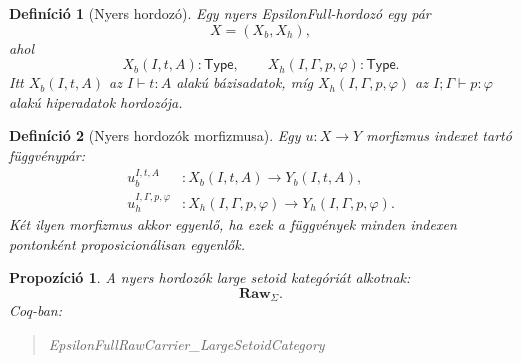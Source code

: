 \documentclass[11pt]{article}
\newtheorem{definition}{Definíció}
\newtheorem{proposition}{Propozíció}
\newenvironment{coqblock}
  {\begin{quote}\small\ttfamily\obeylines}
  {\end{quote}}
\newcommand{\Raw}{\mathbf{Raw}_{\Sigma}}
\begin{document}
\begin{definition}[Nyers hordozó]
Egy nyers EpsilonFull-hordozó egy pár
\[
  X=(X_b,X_h),
\]
ahol
\[
  X_b(I,t,A):\mathsf{Type},
  \qquad
  X_h(I,\Gamma,p,\varphi):\mathsf{Type}.
\]
Itt $X_b(I,t,A)$ az $I\vdash t:A$ alakú bázisadatok, míg
$X_h(I,\Gamma,p,\varphi)$ az
$I;\Gamma\vdash p:\varphi$ alakú hiperadatok hordozója.
\end{definition}

\begin{definition}[Nyers hordozók morfizmusa]
Egy $u:X\to Y$ morfizmus indexet tartó függvénypár:
\[
\begin{aligned}
u_b^{I,t,A} &: X_b(I,t,A)\to Y_b(I,t,A),\\
u_h^{I,\Gamma,p,\varphi} &: X_h(I,\Gamma,p,\varphi)\to
                           Y_h(I,\Gamma,p,\varphi).
\end{aligned}
\]
Két ilyen morfizmus akkor egyenlő, ha ezek a függvények minden indexen
pontonként proposicionálisan egyenlők.
\end{definition}

\begin{proposition}
A nyers hordozók large setoid kategóriát alkotnak:
\[
  \Raw.
\]
Coq-ban:
\begin{coqblock}
EpsilonFullRawCarrier\_LargeSetoidCategory
\end{coqblock}
\end{proposition}
\end{document}
